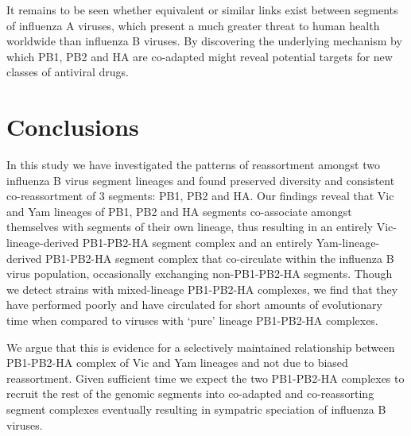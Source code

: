\documentclass[11pt,oneside,letterpaper]{article}
\begin{document}
It remains to be seen whether equivalent or similar links exist between segments of influenza A viruses, which present a much greater threat to human health worldwide than influenza B viruses.
By discovering the underlying mechanism by which PB1, PB2 and HA are co-adapted might reveal potential targets for new classes of antiviral drugs.

\section*{Conclusions}
In this study we have investigated the patterns of reassortment amongst two influenza B virus segment lineages and found preserved diversity and consistent co-reassortment of 3 segments: PB1, PB2 and HA.
Our findings reveal that Vic and Yam lineages of PB1, PB2 and HA segments co-associate amongst themselves with segments of their own lineage, thus resulting in an entirely Vic-lineage-derived PB1-PB2-HA segment complex and an entirely Yam-lineage-derived PB1-PB2-HA segment complex that co-circulate within the influenza B virus population, occasionally exchanging non-PB1-PB2-HA segments.
Though we detect strains with mixed-lineage PB1-PB2-HA complexes, we find that they have performed poorly and have circulated for short amounts of evolutionary time when compared to viruses with `pure' lineage PB1-PB2-HA complexes.

We argue that this is evidence for a selectively maintained relationship between PB1-PB2-HA complex of Vic and Yam lineages and not due to biased reassortment.
Given sufficient time we expect the two PB1-PB2-HA complexes to recruit the rest of the genomic segments into co-adapted and co-reassorting segment complexes eventually resulting in sympatric speciation of influenza B viruses.



\end{document}
